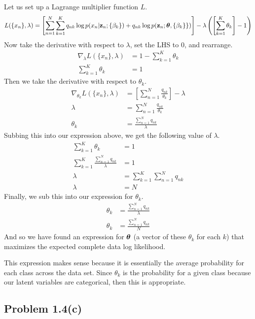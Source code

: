 \documentclass[submit]{harvardml}
\begin{document}
Let us set up a Lagrange multiplier function $L$.
\begin{equation*}
    L(\{x_n\}, \lambda) = \left[\sum_{n=1}^N \sum_{k=1}^K q_{n k} \log p(x_n | \vb{z}_n ; \{\beta_k\}) + q_{n k} \log p(\vb{z}_n ; \boldsymbol{\theta}, \{\beta_k \} \})\right] - \lambda\left(\left[\sum_{k=1}^K\theta_k\right] - 1 \right)
\end{equation*}
Now take the derivative with respect to $\lambda$, set the LHS to $0$, and rearrange.
\begin{align*}
    \nabla_{\lambda}L(\{x_n\}, \lambda) &= 1 - \sum_{k=1}^K \theta_k \\
    \sum_{k=1}^K \theta_k &= 1
\end{align*}
Then we take the derivative with respect to $\theta_k$.
\begin{align*}
    \nabla_{\theta_k}L(\{x_n\}, \lambda) &= \left[ \sum_{n=1}^N \frac{q_{n k}}{\theta_k} \right] - \lambda\\
    \lambda &= \sum_{n=1}^N \frac{q_{n k}}{\theta_k}\\
    \theta_k &= \frac{\sum_{n=1}^N q_{n k}}{\lambda}
\end{align*}
Subbing this into our expression above, we get the following value of $\lambda$.
\begin{align*}
    \sum_{k=1}^K \theta_k &= 1\\
    \sum_{k=1}^K \frac{\sum_{n=1}^N q_{n k}}{\lambda} &= 1\\
    \lambda &= \sum_{k=1}^K \sum_{n=1}^N q_{n k}\\
    \lambda &= N
\end{align*}
Finally, we sub this into our expression for $\theta_k$.
\begin{align*}
    \theta_k &= \frac{\sum_{n=1}^N q_{n k}}{\lambda}\\
    \theta_k &= \frac{\sum_{n=1}^N q_{n k}}{N}
\end{align*}
And so we have found an expression for $\boldsymbol{\theta}$ (a vector of these $\theta_k$ for each $k$) that maximizes the expected complete data log likelihood.

This expression makes sense because it is essentially the average probability for each class across the data set. Since $\theta_k$ is the probability for a given class because our latent variables are categorical, then this is appropriate.

\subsection*{Problem 1.4(c)}
\end{document}
